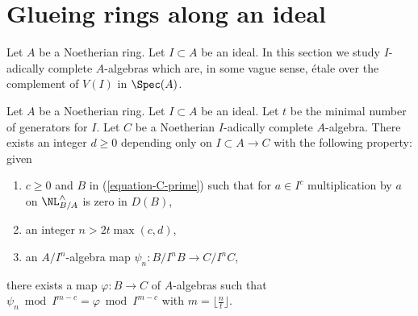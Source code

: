 \section{Glueing rings along an ideal}
\label{section-approximation}

\noindent
Let $A$ be a Noetherian ring. Let $I \subset A$ be an ideal.
In this section we study $I$-adically complete $A$-algebras
which are, in some vague sense, \'etale over the complement of
$V(I)$ in $\Spec(A)$.

\begin{lemma}
\label{lemma-get-morphism-general}
Let $A$ be a Noetherian ring. Let $I \subset A$ be an ideal.
Let $t$ be the minimal number of generators for $I$.
Let $C$ be a Noetherian $I$-adically complete $A$-algebra.
There exists an integer $d \geq 0$ depending only on
$I \subset A \to C$ with the following property: given
\begin{enumerate}
\item $c \geq 0$ and $B$ in (\ref{equation-C-prime}) such that for $a \in I^c$
multiplication by $a$ on $\NL^\wedge_{B/A}$ is zero in $D(B)$,
\item an integer $n > 2t\max(c, d)$,
\item an $A/I^n$-algebra map $\psi_n : B/I^nB \to C/I^nC$,
\end{enumerate}
there exists a map $\varphi : B \to C$ of $A$-algebras such
that $\psi_n \bmod I^{m - c} = \varphi \bmod I^{m - c}$
with $m = \lfloor \frac{n}{t} \rfloor$.
\end{lemma}

